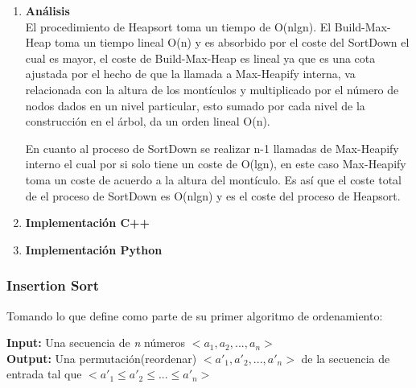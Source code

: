 \documentclass{article}
\begin{document}
                    \begin{enumerate}
                        \item \textbf{An\'{a}lisis}\\
                            El procedimiento de Heapsort toma un tiempo de O(nlgn).
                            El Build-Max-Heap toma un tiempo lineal O(n) y es absorbido por el coste del SortDown el cual es mayor, el coste de Build-Max-Heap es lineal ya que es una cota ajustada por el hecho de que la llamada a Max-Heapify interna, va relacionada con la altura de los mont\'{i}culos y multiplicado por el n\'{u}mero de nodos dados en un nivel particular, esto sumado por cada nivel de la construcción en el \'{a}rbol, da un orden lineal O(n).
                            
                            En cuanto al proceso de SortDown se realizar n-1 
                            llamadas de Max-Heapify interno el cual por si solo tiene un coste de O(lgn), en este caso Max-Heapify toma un coste de acuerdo a la altura del montículo. Es así que el coste total de el proceso de SortDown es O(nlgn) y es el coste del proceso de Heapsort.
                            
                        \item \textbf{Implementaci\'{o}n C++}
                    
                            
                            
                            \item \textbf{Implementaci\'{o}n Python}\\
                    
                            
                    \end{enumerate}
		         
		         
		         \subsubsection{Insertion Sort}
		         
		            Tomando lo que define \cite{CLRS2009} como parte de su primer algoritmo de ordenamiento:
		            
		            \begin{flushleft}
    		            \textbf{Input:} Una secuencia de \textit{n} números $<a_1,a_2,...,a_n>$ \\
    		            \textbf{Output:} Una permutación(reordenar) $<a'_1,a'_2,...,a'_n>$ de la secuencia 
    		            de entrada tal que $<a'_1 \leq a'_2 \leq ... \leq a'_n>$
		            \end{flushleft}
		            
\end{document}
